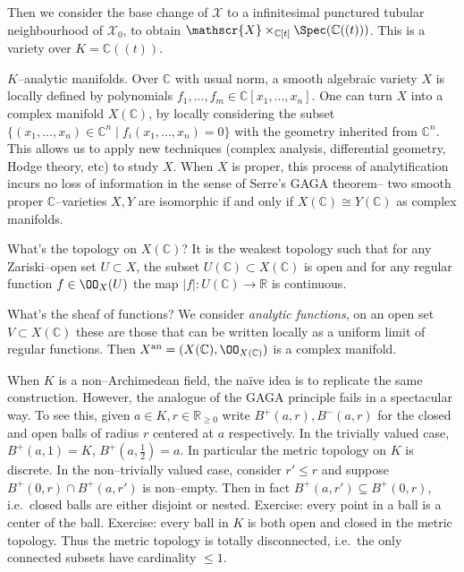 Then we consider the base change of \(\mathscr{X}\) to a infinitesimal punctured
tubular neighbourhood of \(\mathscr{X}_0\), to obtain
\(\mathscr{X}\times_{\mathbb{C}[t]}\Spec(\mathbb{C}((t)))\). This is a variety
over \(K=\mathbb{C}((t))\).

\(K\)--analytic manifolds. Over \(\mathbb{C}\) with usual norm, a smooth
algebraic variety \(X\) is locally defined by polynomials \(f_1,...,f_m\in
\mathbb{C}[x_1,...,x_n]\). One can turn \(X\) into a complex manifold
\(X(\mathbb{C})\), by locally considering the subset \(\{(x_1,...,x_n)\in
\mathbb{C}^n\;|\; f_i(x_1,...,x_n)=0\}\) with the geometry inherited from
\(\mathbb{C}^n\). This allows us to apply new techniques (complex analysis,
differential geometry, Hodge theory, etc) to study \(X\). When \(X\) is proper,
this process of analytification incurs no loss of information in the sense of
Serre's GAGA theorem-- two smooth proper \(\mathbb{C}\)--varieties \(X,Y\) are
isomorphic if and only if \(X(\mathbb{C})\cong Y(\mathbb{C})\) as complex
manifolds.

What's the topology on \(X(\mathbb{C})\)? It is the weakest topology such that
for any Zariski--open set \(U\subset X\), the subset \(U(\mathbb{C})\subset
X(\mathbb{C})\) is open and for any regular function \(f\in \OO_X(U)\) the map
\(|f|:U(\mathbb{C})\to \mathbb{R}\) is continuous.

What's the sheaf of functions? We consider \emph{analytic functions}, on an open
set \(V\subset X(\mathbb{C})\) these are those that can be written locally as a
uniform limit of regular functions. Then
\(X^\text{an}=(X(\mathbb{C}),\OO_{X(\mathbb{C})})\) is a complex manifold.

When \(K\) is a non--Archimedean field, the na\"ive idea is to replicate the
same construction. However, the analogue of the GAGA principle fails in a
spectacular way. To see this, given \(a\in K, r\in \mathbb{R}_{\geq 0}\) write
\(B^+(a,r), B^-(a,r)\) for the closed and open balls of radius \(r\) centered at
\(a\) respectively. In the trivially valued case, \(B^+(a,1)=K\),
\(B^+(a,\frac{1}{2}) = a\). In particular the metric topology on \(K\) is
discrete. In the non--trivially valued case, consider \(r'\leq r\) and suppose
\(B^+(0,r)\cap B^+(a,r')\) is non--empty. Then in fact \(B^+(a,r')\subseteq
B^+(0,r)\), i.e.\ closed balls are either disjoint or nested.
Exercise: every point in a ball is a center of the ball. Exercise: every ball in
\(K\) is both open and closed in the metric topology. Thus the metric topology
is totally disconnected, i.e.\ the only connected subsets have cardinality
\(\leq 1\).

